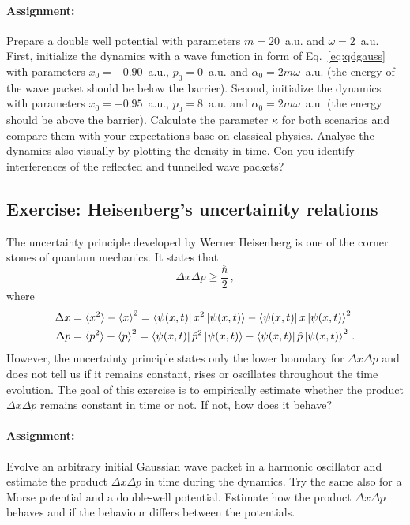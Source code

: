 \paragraph{Assignment:} Prepare a double well potential with parameters $m=20$~a.u. and $\omega=2$~a.u. First, initialize the dynamics with a wave function in form of Eq.~\eqref{eq:qdgauss} with parameters $x_0=-0.90$~a.u., $p_0=0$~a.u. and $\alpha_0 = 2m\omega$~a.u. (the energy of the wave packet should be below the barrier). Second, initialize the dynamics with parameters $x_0=-0.95$~a.u., $p_0=8$~a.u. and $\alpha_0=2m\omega$~a.u. (the energy should be above the barrier). Calculate the parameter $\kappa$ for both scenarios and compare them with your expectations base on classical physics. Analyse the dynamics also visually by plotting the density in time. Con you identify interferences of the reflected and tunnelled wave packets?

\subsection*{Exercise: Heisenberg's uncertainity relations}

The uncertainty principle developed by Werner Heisenberg is one of the corner stones of quantum mechanics. It states that
\begin{equation*}
    \Delta x \Delta p \ge \frac{\hbar}{2} \, , 
\end{equation*}
where
\begin{align*}
    \Delta x &= \braket{x^2} - \braket{x}^2 = \bra{\psi(x, t)}x^2\ket{\psi(x,t)} -  \bra{\psi(x, t)}x\ket{\psi(x,t)}^2\\
    \Delta p &= \braket{p^2} - \braket{p}^2 = \bra{\psi(x, t)}\hat{p}^2\ket{\psi(x,t)} -  \bra{\psi(x, t)}\hat{p}\ket{\psi(x,t)}^2 \, .
\end{align*}
However, the uncertainty principle states only the lower boundary for $\Delta x \Delta p$ and does not tell us if it remains constant, rises or oscillates throughout the time evolution. The goal of this exercise is to empirically estimate whether the product $ \Delta x \Delta p$ remains constant in time or not. If not, how does it behave?

\paragraph{Assignment:} Evolve an arbitrary initial Gaussian wave packet in a harmonic oscillator and estimate the product $\Delta x \Delta p$ in time during the dynamics. Try the same also for a Morse potential and a double-well potential. Estimate how the product $\Delta x \Delta p$ behaves and if the behaviour differs between the potentials.
